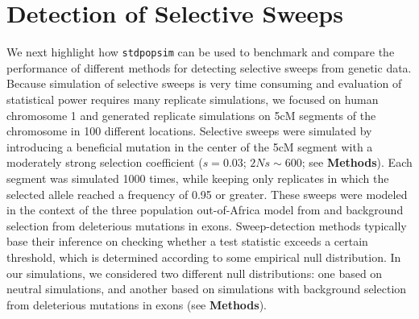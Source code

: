 \documentclass[hidelinks]{article}
\newcommand{\stdpopsim}{\texttt{stdpopsim}\xspace}
\begin{document}
\section*{Detection of Selective Sweeps}
    \label{sweeps}
    We next highlight how \stdpopsim can be used to benchmark and compare
    the performance of different methods for detecting selective sweeps from genetic data.
    Because simulation of selective sweeps is very time consuming and evaluation of statistical power requires
    many replicate simulations, we focused on human chromosome 1 and generated replicate simulations on 5cM segments
    of the chromosome in 100 different locations. %
    Selective sweeps were simulated by introducing a beneficial mutation in the center of the 5cM segment
    with a moderately strong selection coefficient ($s = 0.03$; $2Ns \sim 600$; see \textbf{Methods}).
    Each segment was simulated 1000 times, while keeping only replicates in which the selected allele reached a frequency of 0.95 or greater.
    These sweeps were modeled in the context of the three population out-of-Africa model from \cite{gutenkunst2009inferring}
    and background selection from deleterious mutations in exons.
    Sweep-detection methods typically base their inference on checking whether a test statistic
    exceeds a certain threshold, which is determined according to some empirical null distribution.
    In our simulations, we considered two different null distributions:
    one based on neutral simulations, and another based on simulations with background selection
    from deleterious mutations in exons (see \textbf{Methods}).
  
\end{document}
